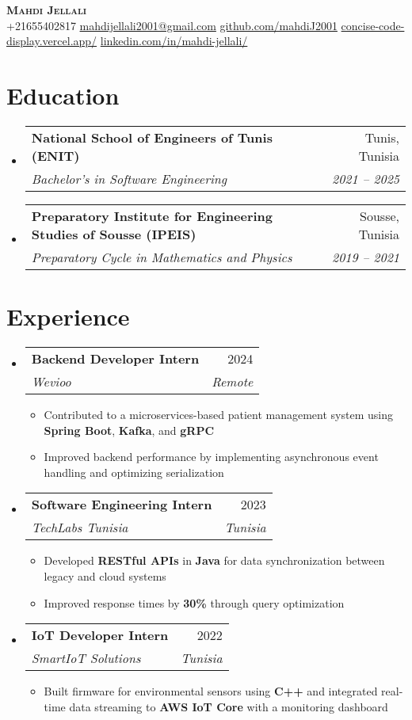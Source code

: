 \documentclass[letterpaper,11pt]{article}
\makeatletter
\newcommand{\resumeItem}[1]{
    \item\small{
            {#1 \vspace{-2pt}}
    }
}
\newcommand{\resumeSubheading}[4]{
    \vspace{-2pt}\item
    \begin{tabular*}{0.97\textwidth}[t]{l@{\extracolsep{\fill}}r}
    \textbf{#1} & #2 \\
    \textit{\small#3} & \textit{\small #4} \\
    \end{tabular*}\vspace{-7pt}
}
\newcommand{\resumeSubHeadingListStart}{\begin{itemize}[leftmargin=0.15in, label={}]}
\newcommand{\resumeSubHeadingListEnd}{\end{itemize}}
\newcommand{\resumeItemListStart}{\begin{itemize}}
\newcommand{\resumeItemListEnd}{\end{itemize}\vspace{-5pt}}
\makeatother
\begin{document}
\begin{center}
\textbf{\Huge \scshape Mahdi Jellali} \\ \vspace{1pt}
\small
+21655402817 \quad
\href{mailto:mahdijellali2001@gmail.com}{mahdijellali2001@gmail.com} \quad
\href{https://github.com/mahdiJ2001}{github.com/mahdiJ2001} \quad
\href{https://concise-code-display.vercel.app/}{concise-code-display.vercel.app/} \quad
\href{https://www.linkedin.com/in/mahdi-jellali/}{linkedin.com/in/mahdi-jellali/}
\end{center}

\vspace{10pt}
\section{Education}
\resumeSubHeadingListStart
\resumeSubheading
{National School of Engineers of Tunis (ENIT)}{Tunis, Tunisia}
{Bachelor’s in Software Engineering}{2021 -- 2025}
\resumeSubheading
{Preparatory Institute for Engineering Studies of Sousse (IPEIS)}{Sousse, Tunisia}
{Preparatory Cycle in Mathematics and Physics}{2019 -- 2021}
\resumeSubHeadingListEnd

\section{Experience}
\resumeSubHeadingListStart
\resumeSubheading
{Backend Developer Intern}{2024}
{Wevioo}{ Remote}
\resumeItemListStart
\resumeItem{Contributed to a microservices-based patient management system using \textbf{Spring Boot}, \textbf{Kafka}, and \textbf{gRPC}}
\resumeItem{Improved backend performance by implementing asynchronous event handling and optimizing serialization}
\resumeItemListEnd
\resumeSubheading
{Software Engineering Intern}{2023}
{TechLabs Tunisia}{Tunisia}
\resumeItemListStart
\resumeItem{Developed \textbf{RESTful APIs} in \textbf{Java} for data synchronization between legacy and cloud systems}
\resumeItem{Improved response times by \textbf{30\%} through query optimization}
\resumeItemListEnd
\resumeSubheading
{IoT Developer Intern}{2022}
{SmartIoT Solutions}{Tunisia}
\resumeItemListStart
\resumeItem{Built firmware for environmental sensors using \textbf{C++} and integrated real-time data streaming to \textbf{AWS IoT Core} with a monitoring dashboard}
\resumeItemListEnd
\resumeSubHeadingListEnd

\end{document}
